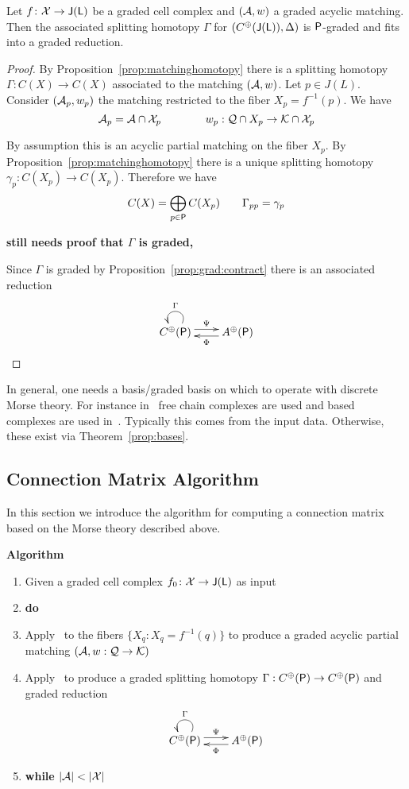 \begin{prop}
Let $f\colon {\mathcal X} \to {\mathsf J}({\mathsf L})$ be a graded cell complex and $({\mathcal A},w)$ a graded acyclic matching.  Then the associated splitting homotopy $\Gamma$ for $(C^\oplus({\mathsf J}({\mathsf L})),\Delta)$ is ${\mathsf P}$-graded and fits into a graded reduction.
\end{prop}
\begin{proof}
By Proposition~\ref{prop:matchinghomotopy} there is a splitting homotopy $\Gamma:C(X)\to C(X)$ associated to the matching $({\mathcal A},w)$.  Let $p\in J(L)$.  Consider $({\mathcal A}_p,w_p)$ the matching restricted to the fiber $X_p = f^{-1}(p)$.  We have $${\mathcal A}_p = {\mathcal A}\cap {\mathcal X}_p\quad\quad \quad \quad  w_p:{\mathcal Q}\cap X_p\to {\mathcal K}\cap {\mathcal X}_p$$

By assumption this is an acyclic partial matching on the fiber $X_p$.  By Proposition~\ref{prop:matchinghomotopy} there is a unique splitting homotopy $\gamma_p:C(X_p)\to C(X_p)$.    Therefore we have $$C(X) = \bigoplus_{p\in {\mathsf P}} C(X_p) \quad\quad \Gamma_{pp} = \gamma_p$$ 

{\bf still needs proof that $\Gamma$ is graded, }

Since $\Gamma$ is graded by Proposition~\ref{prop:grad:contract} there is an associated reduction
\[
\xymatrixrowsep{0.03in}
\xymatrixcolsep{0.3in}
\xymatrix{
 C^\oplus(\sP) \ar@(ur,ul)_{\Gamma}  \ar[r]<3pt>^{\Psi} & \ar[l]<3pt>^{\Phi}A^\oplus(\sP) 
}
\]
\end{proof}

In general, one needs a basis/graded basis on which to operate with discrete Morse theory.  For instance in~\cite{koz2} free chain complexes are used and based complexes are used in~\cite{sko}.  Typically this comes from the input data.  Otherwise, these exist via Theorem~\ref{prop:bases}.




\subsection{Connection Matrix Algorithm}\label{sec:reductions:alg}

In this section we introduce the algorithm for computing a connection matrix based on the Morse theory described above.

{\bf Algorithm}
\begin{enumerate}
\item Given a graded cell complex $f_0\colon {\mathcal X}\to {\mathsf J}({\mathsf L})$ as input
\item {\bf do}
\item Apply~\cite[Algorithm 3.6]{focm} to the fibers $\{X_q\colon X_q = f^{-1}(q)\}$ to produce a graded acyclic partial matching $({\mathcal A},w:{\mathcal Q}\to {\mathcal K})$
\item Apply~\cite[Algorithm 3.12]{focm} to produce a graded splitting homotopy $\Gamma:C^\oplus({\mathsf P})\to C^\oplus({\mathsf P})$ and graded reduction
\[
\xymatrixrowsep{0.03in}
\xymatrixcolsep{0.3in}
\xymatrix{
 C^\oplus(\sP) \ar@(ur,ul)_{\Gamma}  \ar[r]<3pt>^{\Psi} & \ar[l]<3pt>^{\Phi}A^\oplus(\sP) 
}
\]
\item {\bf while $|\cA|<|\cX|$}
\end{enumerate}


